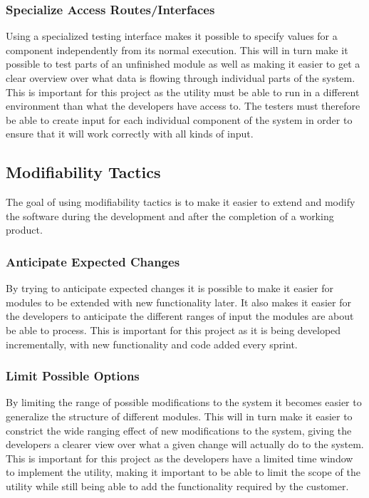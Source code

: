\subsubsection{Specialize Access Routes/Interfaces}
Using a specialized testing interface makes it possible to specify values for a component independently from its normal execution. This will in turn make it possible to test parts of an unfinished module as well as making it easier to get a clear overview over what data is flowing through individual parts of the system. This is important for this project as the utility must be able to run in a different environment than what the developers have access to. The testers must therefore be able to create input for each individual component of the system in order to ensure that it will work correctly with all kinds of input. 

\subsection{Modifiability Tactics}
The goal of using modifiability tactics is to make it easier to extend and modify the software during the development and after the completion of a working product.

\subsubsection{Anticipate Expected Changes}
By trying to anticipate expected changes it is possible to make it easier for modules to be extended with new functionality later. It also makes it easier for the developers to anticipate the different ranges of input the modules are about be able to process. This is important for this project as it is being developed incrementally, with new functionality and code added every sprint.

\subsubsection{Limit Possible Options}
By limiting the range of possible modifications to the system it becomes easier to generalize the structure of different modules. This will in turn make it easier to constrict the wide ranging effect of new modifications to the system, giving the developers a clearer view over what a given change will actually do to the system. This is important for this project as the developers have a limited time window to implement the utility, making it important to be able to limit the scope of the utility while still being able to add the functionality required by the customer.


